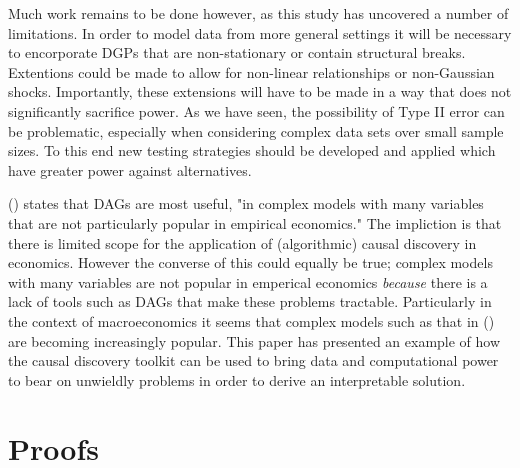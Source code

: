 \documentclass{article}
\begin{document}
Much work remains to be done however, as this study has uncovered a number of limitations. In order to model data from more general settings it will be necessary to encorporate DGPs that are non-stationary or contain structural breaks. Extentions could be made to allow for non-linear relationships or non-Gaussian shocks. Importantly, these extensions will have to be made in a way that does not significantly sacrifice power. As we have seen, the possibility of Type II error can be problematic, especially when considering complex data sets over small sample sizes. To this end new testing strategies should be developed and applied which have greater power against alternatives. 

\citeauthor{imbens2019potential} (\citeyear{imbens2019potential}) states that DAGs are most useful, "in complex models with many variables that are not particularly popular in empirical economics." The impliction is that there is limited scope for the application of (algorithmic) causal discovery in economics. However the converse of this could equally be true; complex models with many variables are not popular in emperical economics \textit{because} there is a lack of tools such as DAGs that make these problems tractable. Particularly in the context of macroeconomics it seems that complex models such as that in \citeauthor{smets2007shocks} (\citeyear{smets2007shocks}) are becoming increasingly popular. This paper has presented an example of how the causal discovery toolkit can be used to bring data and computational power to bear on unwieldly problems in order to derive an interpretable solution.

\newpage
\printbibliography

\newpage
\appendix
\section{Proofs} \label{proofs}
\end{document}
